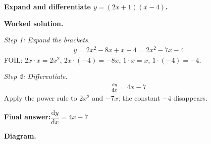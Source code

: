 \documentclass[11pt]{article}
\newcommand{\question}[1]{\par\medskip\noindent\textbf{#1}\par}
\begin{document}
\question{Expand and differentiate \( y = (2x + 1)(x - 4) \).}

\textbf{Worked solution.}

\textit{Step 1: Expand the brackets.}
\[\begin{gathered}
y = 2x^2 - 8x + x - 4 = 2x^2 - 7x - 4
\end{gathered}\]
FOIL: \( 2x \cdot x = 2x^2 \), \( 2x \cdot (-4) = -8x \), \( 1 \cdot x = x \), \( 1 \cdot (-4) = -4 \).

\textit{Step 2: Differentiate.}
\[\begin{gathered}
\frac{\mathrm{d}y}{\mathrm{d}x} = 4x - 7
\end{gathered}\]
Apply the power rule to \(2x^2\) and \(-7x\); the constant \(-4\) disappears.

\begin{answerbox}
\textbf{Final answer:}\quad \(\displaystyle  \dfrac{\mathrm{d}y}{\mathrm{d}x} = 4x - 7 \)
\end{answerbox}
\textbf{Diagram.}
\end{document}

